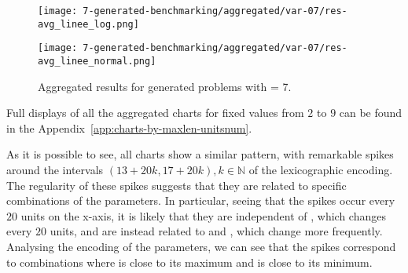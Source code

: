\begin{figure}[H]
  \centering
  \begin{minipage}{\textwidth}
    \centering
    \texttt{[image: 7-generated-benchmarking/aggregated/var-07/res-avg\_linee\_log.png]}
  \end{minipage}
  \hfill
  \begin{minipage}{\textwidth}
    \centering
    \texttt{[image: 7-generated-benchmarking/aggregated/var-07/res-avg\_linee\_normal.png]}
  \end{minipage}
  \caption{Aggregated results for generated problems with  = 7.}\label{fig:agg-var7}
\end{figure}
Full displays of all the aggregated charts for fixed  values from \(2\) to \(9\) can be found in the Appendix~\ref{app:charts-by-maxlen-unitsnum}.

As it is possible to see, all charts show a similar pattern, with remarkable spikes around the intervals \((13+20k, 17+20k), k \in \mathbb{N}\) of the lexicographic encoding.
The regularity of these spikes suggests that they are related to specific combinations of the parameters. In particular, seeing that the spikes occur every \(20\) units on the x-axis, it is likely that they are independent of , which changes every \(20\) units, and are instead related to  and , which change more frequently.
Analysing the encoding of the parameters, we can see that the spikes correspond to combinations where  is close to its maximum and  is close to its minimum.

